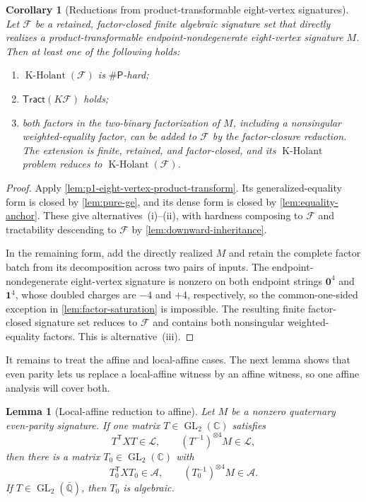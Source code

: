 \documentclass[11pt,letterpaper,onecolumn]{article}
\theoremstyle{plain}
\newtheorem{lemma}[lemma]{Lemma}
\newtheorem{corollary}[corollary]{Corollary}
\theoremstyle{definition}
\theoremstyle{remark}
\newcommand{\AlgNums}{\overline{\mathbb Q}}
\newcommand{\cF}{\mathcal F}
\newcommand{\cA}{\mathscr A}
\newcommand{\cL}{\mathscr L}
\newcommand{\KHolant}{\operatorname{K\text{-}Holant}}
\newcommand{\Tract}{\mathsf{Tract}}
\newcommand{\SharpP}{\#\mathsf P}
\newcommand{\GL}{\operatorname{GL}}
\newcommand{\one}{\mathbf 1}
\newcommand{\zero}{\mathbf 0}
\begin{document}
\begin{corollary}[Reductions from product-transformable eight-vertex signatures]
\label{cor:p1-eight-vertex-product-operational}
Let \(\cF\) be a retained, factor-closed finite algebraic signature
set that directly realizes a product-transformable endpoint-nondegenerate eight-vertex signature
\(M\).  Then at least one of the following holds:
\begin{enumerate}[label=\textnormal{(\roman*)}]
\item \(\KHolant(\cF)\) is \(\SharpP\)-hard;
\item \(\Tract(K\cF)\) holds;
\item both factors in the two-binary factorization of \(M\), including
      a nonsingular weighted-equality factor, can be added to \(\cF\)
      by the factor-closure reduction. The extension is finite, retained,
      and factor-closed, and its \(\KHolant\) problem reduces to
      \(\KHolant(\cF)\).
\end{enumerate}
\end{corollary}

\begin{proof}
Apply \cref{lem:p1-eight-vertex-product-transform}.  Its generalized-equality
form is closed by \cref{lem:pure-ge}, and its dense form is closed by
\cref{lem:equality-anchor}.  These give alternatives~(i)--(ii), with
hardness composing to \(\cF\) and tractability descending to
\(\cF\) by \cref{lem:downward-inheritance}.

In the remaining form, add the directly realized \(M\) and retain the
complete factor batch from its decomposition across two pairs of inputs.  The
endpoint-nondegenerate eight-vertex signature is nonzero on both endpoint
strings \(\zero^4\) and \(\one^4\), whose doubled charges are \(-4\) and
\(+4\), respectively, so the common-one-sided exception in
\cref{lem:factor-saturation} is impossible.  The resulting finite
factor-closed signature set reduces to \(\cF\) and
contains both nonsingular weighted-equality factors.  This is
alternative~(iii).
\end{proof}

It remains to treat the affine and local-affine cases. The next lemma
shows that even parity lets us replace a local-affine witness by an
affine witness, so one affine analysis will cover both.

\begin{lemma}[Local-affine reduction to affine]
\label{lem:p1-eight-vertex-local-affine-collapse}
Let \(M\) be a nonzero quaternary even-parity signature.  If one matrix
\(T\in\GL_2(\mathbb C)\) satisfies
\[
  T^{\mathsf T}XT\in\cL,
  \qquad (T^{-1})^{\otimes4}M\in\cL,
\]
then there is a matrix \(T_0\in\GL_2(\mathbb C)\) with
\[
  T_0^{\mathsf T}XT_0\in\cA,
  \qquad (T_0^{-1})^{\otimes4}M\in\cA.
\]
If \(T\in\GL_2(\AlgNums)\), then \(T_0\) is algebraic.
\end{lemma}
\end{document}
